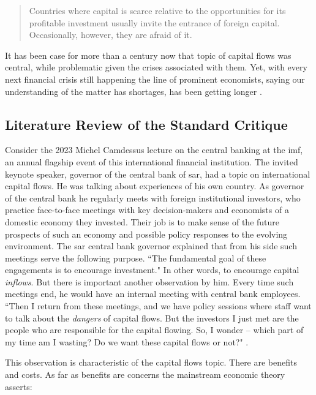 \begin{quote}
Countries where capital is scarce relative to the opportunities for its profitable investment usually invite the entrance of foreign capital. Occasionally, however, they are afraid of it. \citep[p.~39]{viner1926}
\end{quote}

It has been case for more than a century now that topic of capital flows was central, while problematic given the crises associated with them. Yet, with every next financial crisis still happening the line of prominent economists, saying our understanding of the matter has shortages, has been getting longer \citep[see][]{roosa1983,eichengreen2001,kforbes2005,abdelal2007}.  

\subsection{Literature Review of the Standard Critique}

Consider the 2023 Michel Camdessus lecture on the central banking at the \ac{imf}, an annual flagship event of this international financial institution. The invited keynote speaker, governor of the central bank of \ac{sar}, had a topic on international capital flows. He was talking about experiences of his own country. As governor of the central bank he regularly meets with foreign institutional investors, who practice face-to-face meetings with key decision-makers and economists of a domestic economy they invested. Their job is to make sense of the future prospects of such an economy and possible policy responses to the evolving environment. The \ac{sar} central bank governor explained that from his side such meetings serve the following purpose. ``The fundamental goal of these engagements is to encourage investment." In other words, to encourage capital \textit{inflows}. But there is important another observation by him. Every time such meetings end, he would have an internal meeting with central bank employees. ``Then I return from these meetings, and we have policy sessions where staff want to talk about the \textit{dangers} of capital flows. But the investors I just met are the people who are responsible for the capital flowing. So, I wonder -- which part of my time am I wasting? Do we want these capital flows or not?" \citep[emphasis added]{sarb2023}.

This observation is characteristic of the capital flows topic. There are benefits and costs. As far as benefits are concerns the mainstream economic theory asserts:

